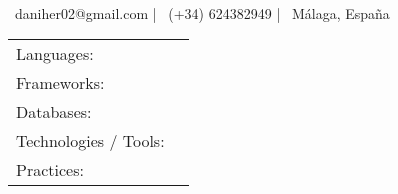 \documentclass[]{awesome-cv}
\begin{document}
    
\begin{center}
	  \\
	\vspace{2mm}
	{\hspace{0.8cm}\faEnvelope\ daniher02@gmail.com}  |  {\faMobile\ (+34) 624382949}  |  {\faMapMarker\ Málaga, España} 
\end{center}

\begin{cventries}
	\cventry
	{}
	{\def\arraystretch{1.15}{\begin{tabular}{ l l }
		Languages:  & {\skill{ Python, R, PHP, JavaScript, TypeScript, SQL, HTML, CSS}} \\
		Frameworks:  & {\skill{ Django, Fast Api, React, Astro.}} \\
		Databases:  & {\skill{ MySQL, PostgreSQL, SQLite, Redis.}} \\
		Technologies / Tools: \hspace{0.05cm} & {\skill{ Docker, Caprover, pipenv, Celery, npm, Git, GitHub Actions, Api Rest.}} \\
		Practices:  & {\skill{ Agile, SOLID Principles, Code Reviews.}} \\
		\end{tabular}}}
	{}
	{}
	{}
\end{cventries}
\vspace{-7mm}
\end{document}
